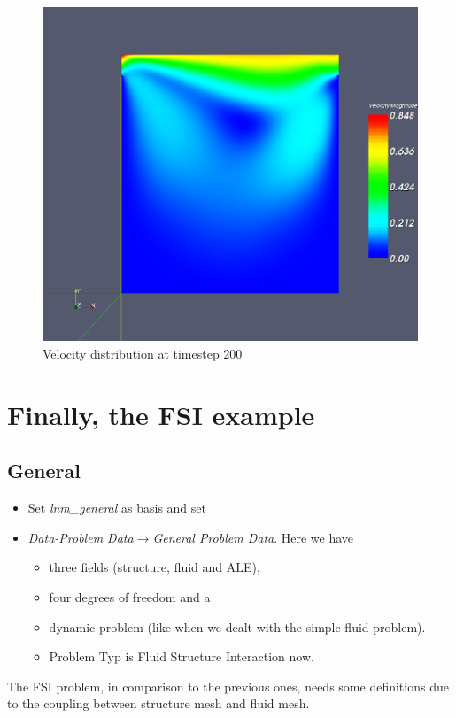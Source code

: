 %
\begin{figure}[h]
\includegraphics[scale=0.4]{Bilder/fluid_02}


\caption{\label{tut_fsi:4.2} Velocity distribution at timestep 200}
\end{figure}



\section{Finally, the FSI example}


\subsection{General}

\begin{itemize}
\item Set \emph{lnm\_general} as basis and set \emph{}
\item \emph{Data-Problem Data$\to$General Problem Data}. Here we have 

\begin{itemize}
\item three fields (structure, fluid and ALE), 
\item four degrees of freedom and a 
\item dynamic problem (like when we dealt with the simple fluid problem). 
\item Problem Typ is Fluid Structure Interaction now.
\end{itemize}
\end{itemize}
The FSI problem, in comparison to the previous ones, needs some 
definitions due to the coupling between structure mesh and fluid mesh.

